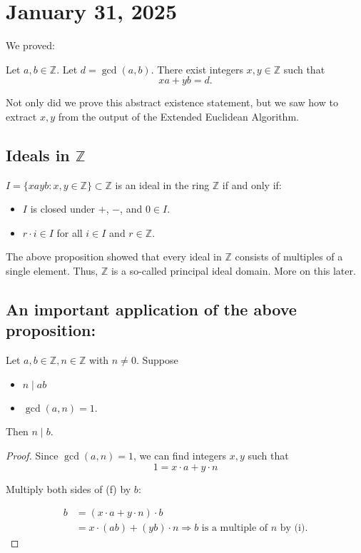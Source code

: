 \documentclass[11pt, draft]{article}
\begin{document}
\section{January 31, 2025}

We proved:

\begin{proposition}
    Let $a, b \in \mathbb{Z}$. Let $d = \operatorname{gcd}(a, b)$. There exist integers $x, y \in \mathbb{Z}$ such that
    \[
        xa + yb = d.
    \]
\end{proposition}

Not only did we prove this abstract existence statement, but we saw how to
extract \(x, y\) from the output of the Extended Euclidean Algorithm.

\subsection{Ideals in \(\mathbb{Z}\)}

\(I = \{xayb : x, y \in \mathbb{Z}\} \subset \mathbb{Z}\) is an ideal in the ring \(\mathbb{Z}\) if and only if:

\begin{itemize}
    \item \(I\) is closed under \(+\), \(-\), and \(0 \in I\).
    \item \(r \cdot i \in I\) for all \(i \in I\) and \(r \in \mathbb{Z}\).
\end{itemize}

The above proposition showed that every ideal in \(\mathbb{Z}\) consists of
multiples of a single element. Thus, \(\mathbb{Z}\) is a so-called principal
ideal domain. More on this later.

\subsection{An important application of the above proposition:}

\begin{lemma}
    Let \(a, b \in \mathbb{Z}, n \in \mathbb{Z}\) with \(n \neq 0\). Suppose

    \begin{itemize}
        \item \(n \mid ab\)
        \item \(\operatorname{gcd}(a, n) = 1\).
    \end{itemize}

    Then \(n \mid b\).
\end{lemma}
\begin{proof}
    Since \(\operatorname{gcd}(a, n) = 1\), we can find integers \(x, y\) such that
    \[
        1 = x \cdot a + y \cdot n
    \]

    Multiply both sides of (f) by \(b\):

    \[
        \begin{aligned}
            b & = (x \cdot a + y \cdot n) \cdot b                                                       \\
              & = x \cdot (ab) + (yb) \cdot n \Rightarrow b \text{ is a multiple of } n \text{ by (i)}.
        \end{aligned}
    \]
\end{proof}
\end{document}

